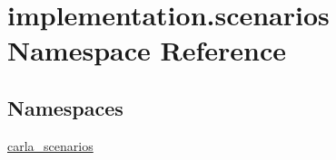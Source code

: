 \hypertarget{namespaceimplementation_1_1scenarios}{}\section{implementation.\+scenarios Namespace Reference}
\label{namespaceimplementation_1_1scenarios}
\subsection*{Namespaces}
\begin{DoxyCompactItemize}
\item 
 \hyperlink{namespaceimplementation_1_1scenarios_1_1carla__scenarios}{carla\+\_\+scenarios}
\end{DoxyCompactItemize}
